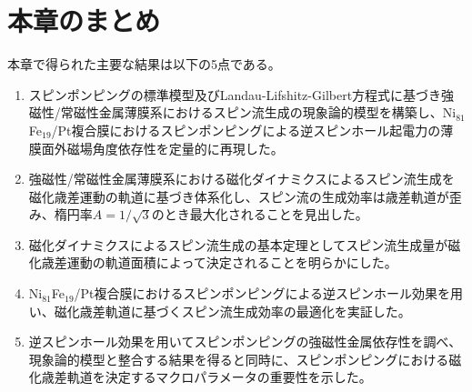 \section{本章のまとめ}
本章で得られた主要な結果は以下の5点である。
\begin{enumerate}
 \item スピンポンピングの標準模型及びLandau-Lifshitz-Gilbert方程式に基づき強磁性/常磁性金属薄膜系におけるスピン流生成の現象論的模型を構築し、Ni$_{81}$Fe$_{19}$/Pt複合膜におけるスピンポンピングによる逆スピンホール起電力の薄膜面外磁場角度依存性を定量的に再現した。
 \item 強磁性/常磁性金属薄膜系における磁化ダイナミクスによるスピン流生成を磁化歳差運動の軌道に基づき体系化し、スピン流の生成効率は歳差軌道が歪み、楕円率$A=1/\sqrt{3}$のとき最大化されることを見出した。
 \item 磁化ダイナミクスによるスピン流生成の基本定理としてスピン流生成量が磁化歳差運動の軌道面積によって決定されることを明らかにした。
 \item Ni$_{81}$Fe$_{19}$/Pt複合膜におけるスピンポンピングによる逆スピンホール効果を用い、磁化歳差軌道に基づくスピン流生成効率の最適化を実証した。
 \item 逆スピンホール効果を用いてスピンポンピングの強磁性金属依存性を調べ、現象論的模型と整合する結果を得ると同時に、スピンポンピングにおける磁化歳差軌道を決定するマクロパラメータの重要性を示した。
\end{enumerate}

